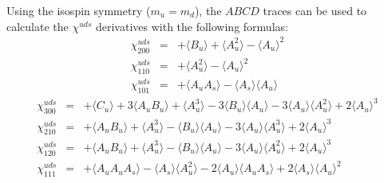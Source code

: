 \documentclass[a4paper,11pt]{article}
\begin{document}
Using the isospin symmetry ($m_u=m_d$), the $ABCD$ traces can be used to calculate the $\chi^{uds}$ derivatives
with the following formulas:
\begin{eqnarray}
\chi^{uds}_{200} &=&
+ \langle B_u\rangle
+ \langle A_u^2\rangle
- \langle A_u\rangle^2
\\
\chi^{uds}_{110} &=&
+ \langle A_u^2\rangle
- \langle A_u\rangle^2
\\
\chi^{uds}_{101} &=&
+ \langle A_u A_s\rangle
- \langle A_s\rangle\langle A_u\rangle
\end{eqnarray}
\begin{eqnarray}
\chi^{uds}_{300} &=&
+ \langle C_u\rangle
+3 \langle A_u B_u\rangle
+ \langle A_u^3\rangle
-3 \langle B_u\rangle\langle A_u\rangle
-3 \langle A_u\rangle\langle A_u^2\rangle
+2 \langle A_u\rangle^3
\\
\chi^{uds}_{210} &=&
+ \langle A_u B_u\rangle
+ \langle A_u^3\rangle
- \langle B_u\rangle\langle A_u\rangle
-3 \langle A_u\rangle\langle A_u^3\rangle
+2 \langle A_u\rangle^3
\\
\chi^{uds}_{120} &=&
+ \langle A_u B_u\rangle
+ \langle A_u^3\rangle
- \langle B_u\rangle\langle A_u\rangle
-3 \langle A_u\rangle\langle A_u^2\rangle
+2 \langle A_u\rangle^3
\\
\chi^{uds}_{111} &=&
+ \langle A_u A_u A_s\rangle
- \langle A_s\rangle\langle A_u^2\rangle
-2 \langle A_u\rangle\langle A_u A_s\rangle
+2 \langle A_s\rangle\langle A_u\rangle^2
\end{eqnarray}
\end{document}
